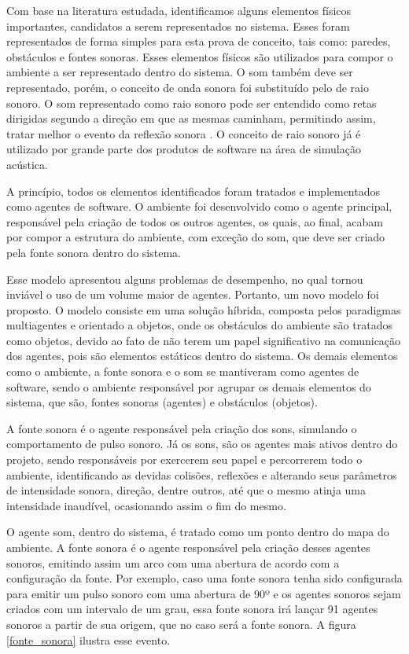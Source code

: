 Com base na literatura estudada, identificamos alguns elementos físicos importantes, candidatos a serem representados no sistema. Esses foram representados de forma simples para esta prova de conceito, tais como: paredes, obstáculos e fontes sonoras. Esses elementos físicos são utilizados para compor o ambiente a ser representado dentro do sistema. O som também deve ser representado, porém, o conceito de onda sonora foi substituído pelo de raio sonoro. O som representado como raio sonoro pode ser entendido como retas dirigidas segundo a direção em que as mesmas caminham, permitindo assim, tratar melhor o evento da reflexão sonora \cite{silva}. O conceito de raio sonoro já é utilizado por grande parte dos produtos de software na área de simulação acústica.

A princípio, todos os elementos identificados foram tratados e implementados como agentes de software. O ambiente foi desenvolvido como o agente principal, responsável pela criação de todos os outros agentes, os quais, ao final, acabam por compor a estrutura do ambiente, com exceção do som, que deve ser criado pela fonte sonora dentro do sistema.

Esse modelo apresentou alguns problemas de desempenho, no qual tornou inviável o uso de um volume maior de agentes. Portanto, um novo modelo foi proposto. O modelo consiste em uma solução híbrida, composta pelos paradigmas multiagentes e orientado a objetos, onde os obstáculos do ambiente são tratados como objetos, devido ao fato de não terem um papel significativo na comunicação dos agentes, pois são elementos estáticos dentro do sistema. Os demais elementos como o ambiente, a fonte sonora e o som se mantiveram como agentes de software, sendo o ambiente responsável por agrupar os demais elementos do sistema, que são, fontes sonoras (agentes) e obstáculos (objetos). 

A fonte sonora é o agente responsável pela criação dos sons, simulando o comportamento de pulso sonoro. Já os sons, são os agentes mais ativos dentro do projeto, sendo responsáveis por exercerem seu papel e percorrerem todo o ambiente, identificando as devidas colisões, reflexões e alterando seus parâmetros de intensidade sonora, direção, dentre outros, até que o mesmo atinja uma intensidade inaudível, ocasionando assim o fim do mesmo.

O agente som, dentro do sistema, é tratado como um ponto dentro do mapa do ambiente. A fonte sonora é o agente responsável pela criação desses agentes sonoros, emitindo assim um arco com uma abertura de acordo com a configuração da fonte. Por exemplo, caso uma fonte sonora tenha sido configurada para emitir um pulso sonoro com uma abertura de 90º e os agentes sonoros sejam criados com um intervalo de um grau, essa fonte sonora irá lançar 91 agentes sonoros a partir de sua origem, que no caso será a fonte sonora. A figura \ref{fonte_sonora} ilustra esse evento.
 
